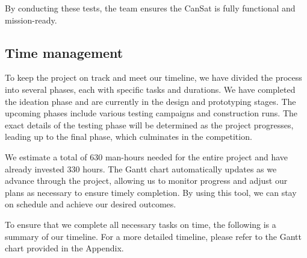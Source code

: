 By conducting these tests, the team ensures the CanSat is fully functional and mission-ready.

 


\subsection{Time management}
To keep the project on track and meet our timeline, we have divided the process into several phases, each with specific tasks and durations. We have completed the ideation phase and are currently in the design and prototyping stages. The upcoming phases include various testing campaigns and construction runs. The exact details of the testing phase will be determined as the project progresses, leading up to the final phase, which culminates in the competition.

We estimate a total of 630 man-hours needed for the entire project and have already invested 330 hours. The Gantt chart automatically updates as we advance through the project, allowing us to monitor progress and adjust our plans as necessary to ensure timely completion. By using this tool, we can stay on schedule and achieve our desired outcomes.

 



To ensure that we complete all necessary tasks on time, the following is a summary of our timeline. For a more detailed timeline, please refer to the Gantt chart provided in the Appendix.

